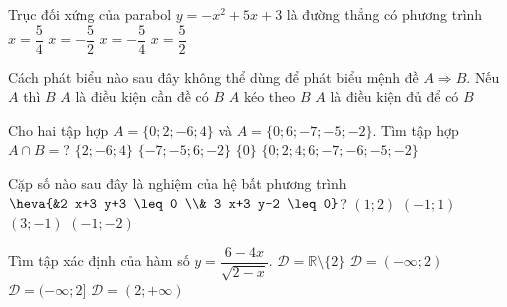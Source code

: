 \begin{ex}%
	Trục đối xứng của parabol $y=-x^2+5 x+3$ là đường thẳng có phương trình
	\choice
	{$x=\dfrac{5}{4}$}
	{$x=-\dfrac{5}{2}$}
	{$x=-\dfrac{5}{4}$}
	{\True $x=\dfrac{5}{2}$}
\end{ex}
\begin{ex} %
	Cách phát biểu nào sau đây không thể dùng để phát biểu mệnh đề $A \Rightarrow B$.
	\choice
	{Nếu $A$ thì $B$}
	{\True $A$ là điều kiện cần đề có $B$}
	{$A$ kéo theo $B$}
	{$A$ là điều kiện đủ để có $B$}
\end{ex}
\begin{ex}%
	Cho hai tập hợp $A=\{0 ; 2 ;-6 ; 4\}$ và $A=\{0 ; 6 ;-7 ;-5 ;-2\}$. Tìm tập hợp $A \cap B=$?
	\choice
	{$\{2 ;-6 ; 4\}$}
	{$\{-7 ;-5 ; 6 ;-2\}$}
	{\True $\{0\}$}
	{$\{0 ; 2 ; 4 ; 6 ;-7 ;-6 ;-5 ;-2\}$}
\end{ex}
\begin{ex}%
	Cặp số nào sau đây là nghiệm của hệ bất phương trình $\heva{&2 x+3 y+3 \leq 0 \\& 3 x+3 y-2 \leq 0}$?
	\choice 
	{$(1;2)$}
	{$(-1;1)$}
	{$(3;-1)$}
	{\True $(-1;-2)$}
\end{ex}
\begin{ex}%
	Tìm tập xác định của hàm số $y=\dfrac{6-4 x}{\sqrt{2-x}}$.
	\choice 
	{ $\mathscr{D}=\mathbb{R} \setminus\{2\}$}
	{\True $\mathscr{D}=(-\infty ; 2)$}
	{$\mathscr{D}=(-\infty ; 2]$}
	{$\mathscr{D}=(2 ;+\infty)$}
\end{ex}
